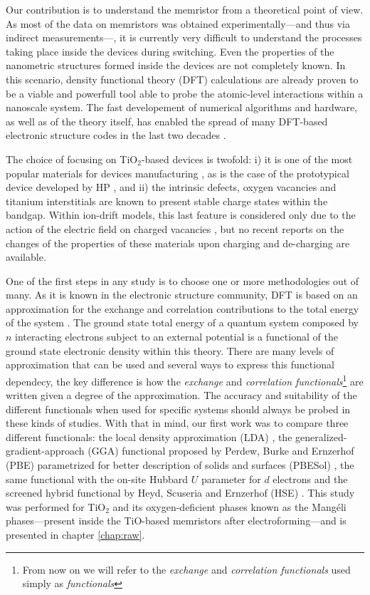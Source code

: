 Our contribution is to understand the memristor from a theoretical point of view. As most of the data on memristors was obtained experimentally---and thus via indirect measurements---, it is currently very difficult to understand the processes taking place inside the devices during switching. Even the properties of the nanometric structures formed inside the devices are not completely known. In this scenario, density functional theory (DFT) calculations are already proven to be a viable and powerfull tool able to probe the atomic-level interactions within a nanoscale system. The fast developement of numerical algorithms and hardware, as well as of the theory itself, has enabled the spread of many DFT-based electronic structure codes in the last two decades \cite{Becke2014,Capelle2006}.

The choice of focusing on TiO$_2$-based devices is twofold: i) it is one of the most popular materials for devices manufacturing \cite{Szot2011,Gale2014,Jeong2012,Miao2011b}, as is the case of the prototypical device developed by HP \cite{Williams2008}, and ii) the intrinsic defects, oxygen vacancies and titanium interstitials are known to present stable charge states \cite{Janotti2010,Lee2012} within the bandgap. Within ion-drift models, this last feature is considered only due to the action of the electric field on charged vacancies \cite{Strukov2009,Williams2008,Kwon2010}, but no recent reports on the changes of the properties of these materials upon charging and de-charging are available.

One of the first steps in any study is to choose one or more methodologies out of many. As it is known in the electronic structure community, DFT is based on an approximation for the exchange and correlation contributions to the total energy of the system \cite{Capelle2006,Becke2014}. The ground state total energy of a quantum system composed by $n$ interacting electrons subject to an external potential is a functional of the ground state electronic density within this theory. There are many levels of approximation that can be used and several ways to express this functional dependecy, the key difference is how the \textit{exchange} and \textit{correlation functionals}\footnote{From now on we will refer to the \textit{exchange} and \textit{correlation functionals} used simply as \textit{functionals}} are written given a degree of the approximation. The accuracy and suitability of the different functionals when used for specific systems should always be probed in these kinds of studies. With that in mind, our first work was to compare three different functionals: the local density approximation (LDA) \cite{Ceperley1980}, the generalized-gradient-approach (GGA) functional proposed by Perdew, Burke and Ernzerhof (PBE) \cite{Perdew1997} parametrized for better description of solids and surfaces (PBESol) \cite{Perdew2008}, the same functional with the on-site Hubbard $U$ parameter for $d$ electrons \cite{Dudarev1998} and the screened hybrid functional by Heyd, Scuseria and Ernzerhof (HSE) \cite{Heyd2003}. This study was performed for TiO$_2$ and its oxygen-deficient phases known as the Mangéli phases---present inside the TiO-based memristors after electroforming---and is presented in chapter \ref{chap:raw}.

